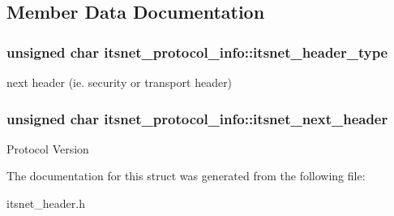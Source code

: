 \subsection{\-Member \-Data \-Documentation}
\hypertarget{structitsnet__protocol__info_ab51f33d251bae7f209e7047572450a06}{
\subsubsection[{itsnet\-\_\-header\-\_\-type}]{\setlength{\rightskip}{0pt plus 5cm}unsigned char {\bf itsnet\-\_\-protocol\-\_\-info\-::itsnet\-\_\-header\-\_\-type}}}\label{structitsnet__protocol__info_ab51f33d251bae7f209e7047572450a06}
next header (ie. security or transport header) \hypertarget{structitsnet__protocol__info_ae4adf5c9cf449706a27b57df3c064147}{
\subsubsection[{itsnet\-\_\-next\-\_\-header}]{\setlength{\rightskip}{0pt plus 5cm}unsigned char {\bf itsnet\-\_\-protocol\-\_\-info\-::itsnet\-\_\-next\-\_\-header}}}\label{structitsnet__protocol__info_ae4adf5c9cf449706a27b57df3c064147}
\-Protocol \-Version 

\-The documentation for this struct was generated from the following file\-:\begin{DoxyCompactItemize}
\item 
itsnet\-\_\-header.\-h\end{DoxyCompactItemize}
